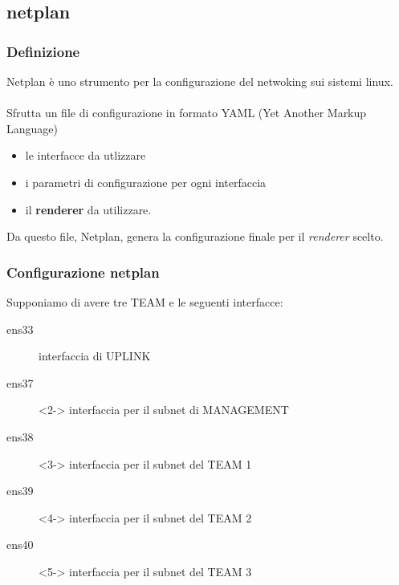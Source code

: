\documentclass{beamer}
\begin{document}
\subsection*{netplan}
\begin{frame}
    \frametitle{Definizione}

     {Netplan è uno strumento per la configurazione del netwoking sui sistemi linux.}
    \\~\\
     {Sfrutta un file di configurazione in formato YAML (Yet Another Markup Language)} 
    \begin{itemize}
        \item <3-> le interfacce da utlizzare
        \item <4-> i parametri di configurazione per ogni interfaccia
        \item <5-> il \textbf{renderer} da utilizzare.
    \end{itemize}
     {Da questo file, Netplan, genera la configurazione finale per il \textit{renderer} scelto.}
\end{frame}

\begin{frame}
    \frametitle{Configurazione netplan}
    Supponiamo di avere tre TEAM e le seguenti interfacce:
    \begin{description}
        \item [ens33] interfaccia di UPLINK
        \item [ens37]<2-> interfaccia per il subnet di MANAGEMENT
        \item [ens38]<3-> interfaccia per il subnet del TEAM 1 
        \item [ens39]<4-> interfaccia per il subnet del TEAM 2
        \item [ens40]<5-> interfaccia per il subnet del TEAM 3
    \end{description}
\end{frame}
\end{document}
